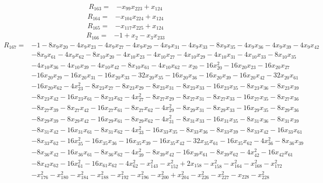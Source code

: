 \begin{align*}
 R_{163}={}&-x_{99}x_{223} +x_{124}
\end{align*}
\begin{align*}
 R_{164}={}&-x_{104}x_{224} +x_{124}
\end{align*}
\begin{align*}
 R_{165}={}&-x_{117}x_{225} +x_{124}
\end{align*}
\begin{align*}
 R_{166}={}&-1 +x_{2} -x_{3}x_{233}
\end{align*}
\begin{align*}
 R_{167}={}&-1 -8x_{9}x_{20} -4x_{9}x_{23} -4x_{9}x_{27} -4x_{9}x_{29} -4x_{9}x_{31} -4x_{9}x_{33} -8x_{9}x_{35} -4x_{9}x_{36} -4x_{9}x_{39} -4x_{9}x_{42}\\
 &-8x_{9}x_{61} -4x_{9}x_{62} -8x_{10}x_{20} -4x_{10}x_{23} -4x_{10}x_{27} -4x_{10}x_{29} -4x_{10}x_{31} -4x_{10}x_{33} -8x_{10}x_{35}\\
 &-4x_{10}x_{36} -4x_{10}x_{39} -4x_{10}x_{42} -8x_{10}x_{61} -4x_{10}x_{62} -x_{20} -16x_{20}^{2} -16x_{20}x_{23} -16x_{20}x_{27}\\
 &-16x_{20}x_{29} -16x_{20}x_{31} -16x_{20}x_{33} -32x_{20}x_{35} -16x_{20}x_{36} -16x_{20}x_{39} -16x_{20}x_{42} -32x_{20}x_{61}\\
 &-16x_{20}x_{62} -4x_{23}^{2} -8x_{23}x_{27} -8x_{23}x_{29} -8x_{23}x_{31} -8x_{23}x_{33} -16x_{23}x_{35} -8x_{23}x_{36} -8x_{23}x_{39}\\
 &-8x_{23}x_{42} -16x_{23}x_{61} -8x_{23}x_{62} -4x_{27}^{2} -8x_{27}x_{29} -8x_{27}x_{31} -8x_{27}x_{33} -16x_{27}x_{35} -8x_{27}x_{36}\\
 &-8x_{27}x_{39} -8x_{27}x_{42} -16x_{27}x_{61} -8x_{27}x_{62} -4x_{29}^{2} -8x_{29}x_{31} -8x_{29}x_{33} -16x_{29}x_{35} -8x_{29}x_{36}\\
 &-8x_{29}x_{39} -8x_{29}x_{42} -16x_{29}x_{61} -8x_{29}x_{62} -4x_{31}^{2} -8x_{31}x_{33} -16x_{31}x_{35} -8x_{31}x_{36} -8x_{31}x_{39}\\
 &-8x_{31}x_{42} -16x_{31}x_{61} -8x_{31}x_{62} -4x_{33}^{2} -16x_{33}x_{35} -8x_{33}x_{36} -8x_{33}x_{39} -8x_{33}x_{42} -16x_{33}x_{61}\\
 &-8x_{33}x_{62} -16x_{35}^{2} -16x_{35}x_{36} -16x_{35}x_{39} -16x_{35}x_{42} -32x_{35}x_{61} -16x_{35}x_{62} -4x_{36}^{2} -8x_{36}x_{39}\\
 &-8x_{36}x_{42} -16x_{36}x_{61} -8x_{36}x_{62} -4x_{39}^{2} -8x_{39}x_{42} -16x_{39}x_{61} -8x_{39}x_{62} -4x_{42}^{2} -16x_{42}x_{61}\\
 &-8x_{42}x_{62} -16x_{61}^{2} -16x_{61}x_{62} -4x_{62}^{2} -x_{143}^{2} -x_{152}^{2} +2x_{158} -x_{158}^{2} -x_{164}^{2} -x_{168}^{2} -x_{172}^{2}\\
 &-x_{176}^{2} -x_{180}^{2} -x_{184}^{2} -x_{188}^{2} -x_{192}^{2} -x_{196}^{2} -x_{200}^{2} +x_{204}^{2} -x_{226}^{2} -x_{227}^{2} -x_{228} -x_{228}^{2}
\end{align*}
